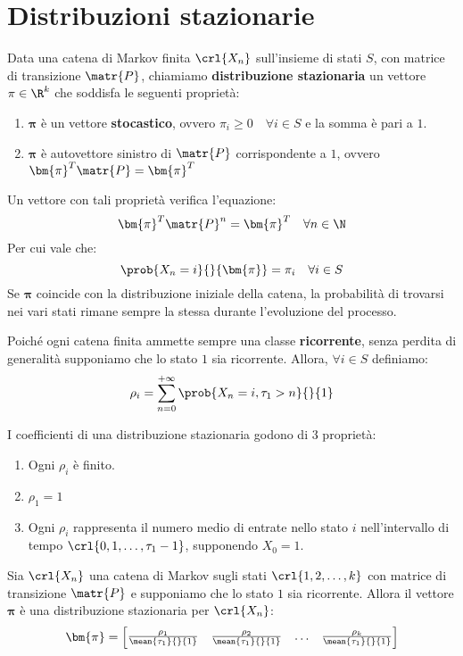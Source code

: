\documentclass[\main/main.tex]{subfiles}
\begin{document}
\section{Distribuzioni stazionarie}
\begin{definition}
  Data una catena di Markov finita \(\crl{X_n}\) sull'insieme di stati \(S\), con matrice di transizione \(\matr{P}\), chiamiamo \textbf{distribuzione stazionaria} un vettore \(\pi \in \R^k\) che soddisfa le seguenti proprietà:
  \begin{enumerate}
    \item \(\bm{\pi} \) è un vettore \textbf{stocastico}, ovvero \(\pi_i \geq 0 \quad \forall i \in S\) e la somma è pari a \(1\).
    \item \(\bm{\pi} \) è autovettore sinistro di \(\matr{P}\) corrispondente a \(1\), ovvero \(\bm{\pi}^T \matr{P} = \bm{\pi}^T\)
  \end{enumerate}
  Un vettore con tali proprietà verifica l'equazione:
  \[
    \bm{\pi}^T \matr{P}^n = \bm{\pi}^T \quad \forall n \in \N
  \]
  Per cui vale che:
  \[
    \prob{X_n = i}{}{\bm{\pi}} = \pi_i \quad \forall i \in S
  \]
  Se \(\bm{\pi} \) coincide con la distribuzione iniziale della catena, la probabilità di trovarsi nei vari stati rimane sempre la stessa durante l'evoluzione del processo.
\end{definition}

\begin{definition}
  Poiché ogni catena finita ammette sempre una classe \textbf{ricorrente}, senza perdita di generalità supponiamo che lo stato \(1\) sia ricorrente. Allora, \(\forall i \in S\) definiamo:
  \[
    \rho_i = \sum_{n=0}^{+\infty} \prob{X_n = i, \tau_1 > n}{}{1}
  \]
\end{definition}

\begin{definition}
  I coefficienti di una distribuzione stazionaria godono di 3 proprietà:
  \begin{enumerate}
    \item Ogni \(\rho_i\) è finito.
    \item \(\rho_1 = 1\)
    \item Ogni \(\rho_i\) rappresenta il numero medio di entrate nello stato \(i\) nell'intervallo di tempo \(\crl{0, 1, \ldots, \tau_1 -1}\), supponendo \(X_0 =1\).
  \end{enumerate}
\end{definition}
\clearpage
\begin{theorem}
  Sia \(\crl{X_n}\) una catena di Markov sugli stati \(\crl{1,2,\ldots, k}\) con matrice di transizione \(\matr{P}\) e supponiamo che lo stato \(1\) sia ricorrente. Allora il vettore \(\bm{\pi} \) è una distribuzione stazionaria per \(\crl{X_n}\):
  \[
    \bm{\pi} = \begin{bmatrix}
      \frac{\rho_1}{\mean{\tau_1}{}{1}} & \frac{\rho_2}{\mean{\tau_1}{}{1}} & \ldots & \frac{\rho_k}{\mean{\tau_1}{}{1}}
    \end{bmatrix}
  \]
\end{theorem}
\end{document}
